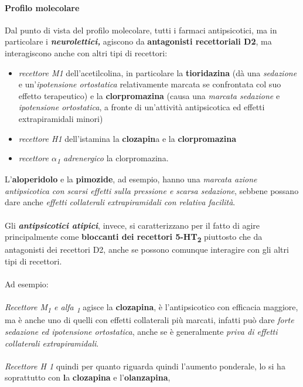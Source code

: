 \paragraph{Profilo molecolare}

Dal punto di vista del profilo molecolare, tutti i farmaci
antipsicotici, ma in particolare i \textbf{\emph{neurolettici,}}
agiscono da \textbf{antagonisti recettoriali D2}, ma interagiscono anche
con altri tipi di recettori:

\begin{itemize}
\item
  \emph{recettore M1} dell'acetilcolina, in particolare la
  \textbf{tioridazina} (dà una \emph{sedazione} e un'\emph{ipotensione
  ortostatica} relativamente marcata se confrontata col suo effetto
  terapeutico) e la \textbf{clorpromazina} (causa una \emph{marcata
  sedazione} e \emph{ipotensione ortostatica}, a fronte di un'attività
  antipsicotica ed effetti extrapiramidali minori)
\item
  \emph{recettore H1} dell'istamina la \textbf{clozapin}a e la
  \textbf{clorpromazina }
\item
  \emph{recettore $\alpha$\textsubscript{1} adrenergico} la clorpromazina.
\end{itemize}

L'\textbf{aloperidolo} e la \textbf{pimozide}, ad esempio, hanno una
\emph{marcata azione antipsicotica con scarsi effetti sulla pressione e
scarsa sedazione}, sebbene possano dare anche \emph{effetti collaterali
extrapiramidali con relativa facilità}.
\\\\
Gli \textbf{\emph{antipsicotici atipici}}, invece, si caratterizzano per
il fatto di agire principalmente come \textbf{bloccanti dei recettori
5-HT\textsubscript{2}} piuttosto che da antagonisti dei recettori D2,
anche se possono comunque interagire con gli altri tipi di recettori.
\\\\
Ad esempio:
\\\\
\emph{Recettore M\textsubscript{1} e alfa \textsubscript{1}} agisce la
\textbf{clozapina}, è l'antipsicotico con efficacia maggiore, ma è anche
uno di quelli con effetti collaterali più marcati, infatti può dare
\emph{forte sedazione ed ipotensione ortostatica}, anche se è
generalmente \emph{priva di effetti collaterali extrapiramidali}.
\\\\
\emph{Recettore H 1} quindi per quanto riguarda quindi l'aumento
ponderale, lo si ha soprattutto con \textbf{l}a \textbf{clozapina} e
l'\textbf{olanzapina},


